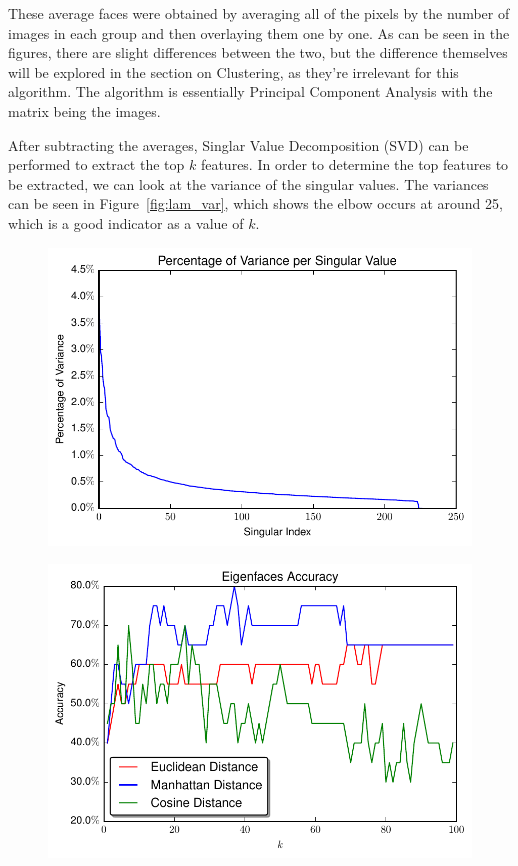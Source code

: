 \documentclass{article}
\begin{document}
These average faces were obtained by averaging all of the pixels by the number of images in each group and then overlaying them one by one. As can be seen in the figures, there are slight differences between the two, but the difference themselves will be explored in the section on Clustering, as they're irrelevant for this algorithm. The algorithm is essentially Principal Component Analysis with the matrix being the images. 

After subtracting the averages, Singlar Value Decomposition (SVD) can be performed to extract the top $k$ features. In order to determine the top features to be extracted, we can look at the variance of the singular values. The variances can be seen in Figure~\ref{fig:lam_var}, which shows the elbow occurs at around 25, which is a good indicator as a value of $k$. 

\begin{figure}
\centering
\begin{minipage}{.5\textwidth}
  \centering
  \includegraphics[width=.85\linewidth]{data/Singularvalue_Variance.pdf}
  \label{fig:lam_var}
\end{minipage}%
\begin{minipage}{.5\textwidth}
  \centering
  \includegraphics[width=.85\linewidth]{data/Accuracy.pdf}
  \label{fig:eig_acc}
\end{minipage}
\end{figure}
\end{document}
